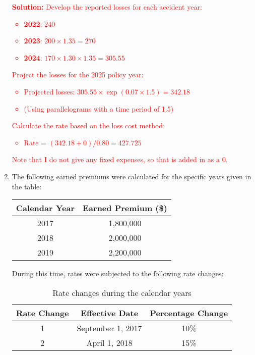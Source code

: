 \documentclass{article}
\begin{document}
\begin{enumerate}
\textcolor{red}{\textbf{Solution:}
Develop the reported losses for each accident year:
\begin{itemize}
    \item \textbf{2022}: $240$
    \item \textbf{2023}: $200 \times 1.35 = 270$
    \item \textbf{2024}: $170 \times 1.30 \times 1.35 = 305.55$
\end{itemize}
Project the losses for the 2025 policy year:
\begin{itemize}
    \item Projected losses: $305.55 \times \exp{(0.07 \times 1.5)} = 342.18$
    \item (Using parallelograms with a time period of 1.5)
\end{itemize}
Calculate the rate based on the loss cost method:
\begin{itemize}
    \item Rate = $(342.18 + 0)/0.80 = 427.725$
\end{itemize}
Note that I do not give any fixed expenses, so that is added in as a 0. 
}
\newpage

\item  
The following earned premiums were calculated for the specific years given in the table:
\begin{table}[h]
\centering
\begin{tabular}{@{}cc@{}}
\toprule
Calendar Year & Earned Premium (\$) \\ \midrule
2017          & 1,800,000           \\
2018          & 2,000,000           \\
2019          & 2,200,000           \\ \bottomrule
\end{tabular}
\end{table}

During this time, rates were subjected to the following rate changes:
\begin{table}[h]
\centering
\begin{tabular}{@{}ccc@{}}
\toprule
Rate Change & Effective Date  & Percentage Change \\ \midrule
1           & September 1, 2017 & 10\%              \\
2           & April 1, 2018    & 15\%              \\ \bottomrule
\end{tabular}
\caption{Rate changes during the calendar years}
\end{table}



\end{enumerate}
\end{document}
